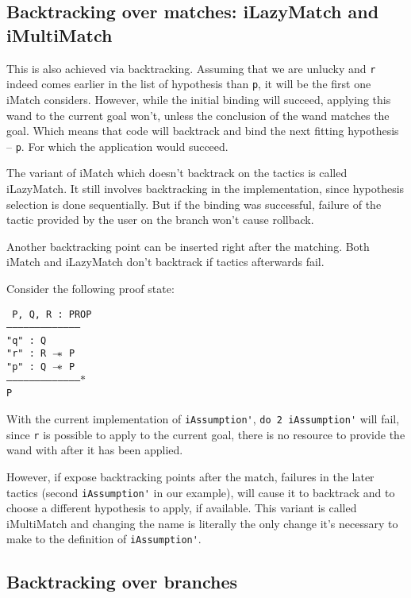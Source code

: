 \subsection{Backtracking over matches: iLazyMatch and iMultiMatch}

This is also achieved via backtracking.
Assuming that we are unlucky and \verb|r| indeed comes earlier in the list of hypothesis than \verb|p|, it will be the first one iMatch considers.
However, while the initial binding will succeed, applying this wand to the current goal won't, unless the conclusion of the wand matches the goal.
Which means that code will backtrack and bind the next fitting hypothesis -- \verb|p|.
For which the application would succeed.

The variant of iMatch which doesn't backtrack on the tactics is called iLazyMatch.
It still involves backtracking in the implementation, since hypothesis selection is done sequentially.
But if the binding was successful, failure of the tactic provided by the user on the branch won't cause rollback.

Another backtracking point can be inserted right after the matching.
Both iMatch and iLazyMatch don't backtrack if tactics afterwards fail.

Consider the following proof state:

\texttt{
P, Q, R : PROP\\
---------------------------------------\\
"q" : Q\\
"r" : R $\mathrel{-\mkern-6mu*}$ P\\
"p" : Q $\mathrel{-\mkern-6mu*}$ P\\
--------------------------------------$\ast$\\
P
}

With the current implementation of \verb|iAssumption'|, \verb|do 2 iAssumption'| will fail, since \verb|r| is possible to apply to the current goal, there is no resource to provide the wand with after it has been applied.

However, if expose backtracking points after the match, failures in the later tactics (second \verb|iAssumption'| in our example), will cause it to backtrack and
to choose a different hypothesis to apply, if available.
This variant is called iMultiMatch and changing the name is literally the only change it's necessary to make to the definition of \verb|iAssumption'|.

\subsection{Backtracking over branches}

